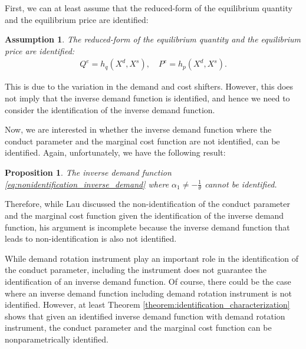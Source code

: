 \documentclass[11pt, a4paper]{article}
\newtheorem{assumption}{Assumption}
\newtheorem{proposition}{Proposition}
\theoremstyle{remark}
\begin{document}
First, we can at least assume that the reduced-form of the equilibrium quantity and the equilibrium price are identified:
\begin{assumption}\label{assumption:reduced_form}
    The reduced-form of the equilibrium quantity and the equilibrium price are identified:
    \begin{align}
        Q^e = h_q(X^{d}, X^{s}), \quad P^e = h_p(X^{d}, X^{s}).
    \end{align}
\end{assumption}
This is due to the variation in the demand and cost shifters.
However, this does not imply that the inverse demand function is identified, and hence we need to consider the identification of the inverse demand function.

Now, we are interested in whether the inverse demand function where the conduct parameter and the marginal cost function are not identified, can be identified.
Again, unfortunately, we have the following result:
\begin{proposition}\label{proposition:nonidentification_inverse_demand_with_nonidentifed_conduct_parameter}
    The inverse demand function \eqref{eq:nonidentification_inverse_demand} where $\alpha_1 \ne -\frac{1}{\theta}$ cannot be identified.
\end{proposition}

Therefore, while Lau discussed the non-identification of the conduct parameter and the marginal cost function given the identification of the inverse demand function, his argument is incomplete because the inverse demand function that leads to non-identification is also not identified.

While demand rotation instrument play an important role in the identification of the conduct parameter, including the instrument does not guarantee the identification of an inverse demand function.
Of course, there could be the case where an inverse demand function including demand rotation instrument is not identified.
However, at least Theorem \ref{theorem:identification_characterization} shows that given an identified inverse demand function with demand rotation instrument, the conduct parameter and the marginal cost function can be nonparametrically identified.


\end{document}

